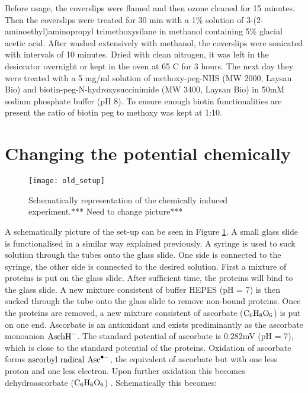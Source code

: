 \documentclass[twoside,single]{lion-msc}
\begin{document}
Before usage, the coverslips were flamed and then ozone cleaned for 15 minutes. Then the coverslips were treated for 30 min with a 1\% solution of 3-(2-aminoethyl)aminopropyl trimethoxysilane in methanol containing 5\% glacial acetic acid. After washed extensively with methanol, the coverslips were sonicated with intervals of 10 minutes. Dried with clean nitrogen, it was left in the desiccator overnight or kept in the oven at 65 \degree C for 3 hours. The next day they were treated with a 5 mg/ml solution of methoxy-peg-NHS (MW 2000, Laysan Bio) and biotin-peg-N-hydroxysuccinimide (MW 3400, Laysan Bio) in 50mM sodium phosphate buffer (pH 8). To ensure enough biotin functionalities are present the ratio of biotin peg to methoxy was kept at 1:10.  






\section{Changing the potential chemically}\label{pot_chem}

\begin{figure}[ht!]
\centering
\texttt{[image: old\_setup]}
\caption{Schematically representation of the chemically induced experiment.*** Need to change picture***}
\label{old_setup}
\end{figure}

A schematically picture of the set-up can be seen in Figure \ref{old_setup}. A small glass slide is functionalised in a similar way explained previously. A syringe is used to suck solution through the tubes onto the glass slide. One side is connected to the syringe, the other side is connected to the desired solution. First a mixture of proteins is put on the glass slide. After sufficient time, the proteins will bind to the glass slide. A new mixture consistent of buffer HEPES (pH = 7) is then sucked through the tube onto the glass slide to remove non-bound proteins. Once the proteins are removed, a new mixture consistent of ascorbate ($\textup{C}_{6}\textup{H}_{8}\textup{O}_{6}$) is put on one end. Ascorbate is an antioxidant and exists prediminantly as the ascorbate monoanion  $\textup{AschH}^{-}$. The standard potential of ascorbate is 0.282mV (pH = 7), which is close to the standard potential of the proteins. Oxidation of ascorbate forms $\textup{ascorbyl radical Asc}^{\bullet  -}$, the equivalent of ascorbate but with one less proton and one less electron. Upon further oxidation this becomes dehydroascorbate ($\textup{C}_{6}\textup{H}_{6}\textup{O}_{6}$) \cite{Warren2010}. Schematically this becomes:
\end{document}
